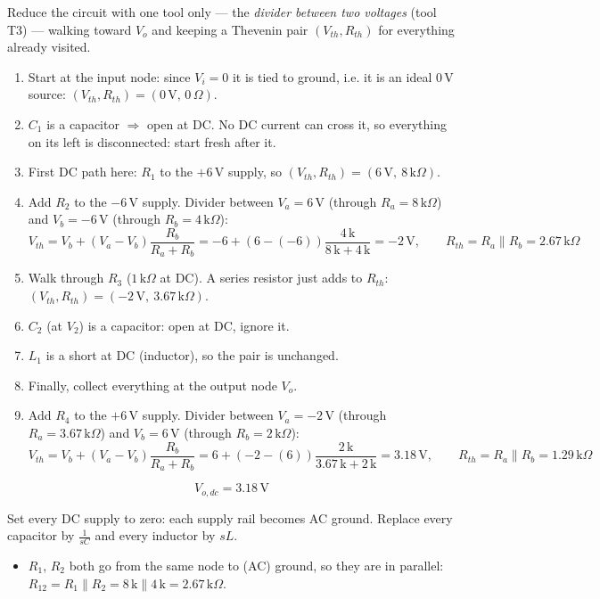 \documentclass[11pt]{article}
\newcommand{\solstep}[2]{\par\medskip{\color{stepc}\textbf{Step #1 --- #2}}\par\nopagebreak}
\begin{document}
Reduce the circuit with one tool only --- the \emph{divider between two voltages} (tool T3) --- walking toward $V_o$ and keeping a Thevenin pair $(V_{th},R_{th})$ for everything already visited.
\begin{enumerate}[leftmargin=*,itemsep=2pt]
\item Start at the input node: since $V_i=0$ it is tied to ground, i.e. it is an ideal $0\,\mathrm{V}$ source: $(V_{th},R_{th})=(0\,\mathrm{V},\,0\,\Omega)$.
\item $C_{1}$ is a capacitor $\Rightarrow$ open at DC. No DC current can cross it, so everything on its left is disconnected: start fresh after it.
\item First DC path here: $R_{1}$ to the $+6\,\mathrm{V}$ supply, so $(V_{th},R_{th}) = (6\,\mathrm{V},\ 8\,\mathrm{k}\Omega)$.
\item Add $R_{2}$ to the $-6\,\mathrm{V}$ supply. Divider between $V_a=6\,\mathrm{V}$ (through $R_a=8\,\mathrm{k}\Omega$) and $V_b=-6\,\mathrm{V}$ (through $R_b=4\,\mathrm{k}\Omega$):\[
V_{th} = V_b + (V_a-V_b)\frac{R_b}{R_a+R_b} = -6 + \left(6 - (-6)\right)\frac{4\,\mathrm{k}}{8\,\mathrm{k} + 4\,\mathrm{k}} = -2\,\mathrm{V},\qquad R_{th} = R_a\parallel R_b = 2.67\,\mathrm{k}\Omega
\]

\item Walk through $R_{3}$ ($1\,\mathrm{k}\Omega$ at DC). A series resistor just adds to $R_{th}$: $(V_{th},R_{th}) = (-2\,\mathrm{V},\ 3.67\,\mathrm{k}\Omega)$.
\item $C_{2}$ (at $V_{2}$) is a capacitor: open at DC, ignore it.
\item $L_{1}$ is a short at DC (inductor), so the pair is unchanged.
\item Finally, collect everything at the output node $V_o$.
\item Add $R_{4}$ to the $+6\,\mathrm{V}$ supply. Divider between $V_a=-2\,\mathrm{V}$ (through $R_a=3.67\,\mathrm{k}\Omega$) and $V_b=6\,\mathrm{V}$ (through $R_b=2\,\mathrm{k}\Omega$):\[
V_{th} = V_b + (V_a-V_b)\frac{R_b}{R_a+R_b} = 6 + \left(-2 - (6)\right)\frac{2\,\mathrm{k}}{3.67\,\mathrm{k} + 2\,\mathrm{k}} = 3.18\,\mathrm{V},\qquad R_{th} = R_a\parallel R_b = 1.29\,\mathrm{k}\Omega
\]

\end{enumerate}

\[
\boxed{V_{o,dc} = 3.18\,\mathrm{V}}
\]

\solstep{3}{AC circuit}Set every DC supply to zero: each supply rail becomes AC ground. Replace every capacitor by $\frac{1}{sC}$ and every inductor by $sL$.
\begin{itemize}[leftmargin=*,itemsep=2pt]
\item $R_{1}$, $R_{2}$ both go from the same node to (AC) ground, so they are in parallel: $R_{12} = R_{1} \parallel R_{2} = 8\,\mathrm{k} \parallel 4\,\mathrm{k} = 2.67\,\mathrm{k}\Omega$.
\end{itemize}
\end{document}
